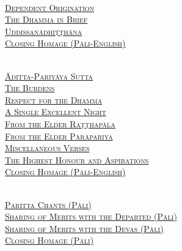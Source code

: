 \begin{center}
  \bigskip
  \clearpage

  {\libertinusFont\selectfont\textbf{\textsc{}}}\\

  \textsc{
    \hyperref[dependent-origination]{Dependent Origination}\\
    \hyperref[dhamma-in-brief]{The Dhamma in Brief}\\
    \hyperref[uddissanadhitthana]{Uddissanādhiṭṭhāna}\\
    \hyperref[closing-homage]{Closing Homage (Pāli-English)}}\\

  \medskip

  {\libertinusFont\selectfont\textbf{\textsc{}}}\\

  \textsc{
    \hyperref[aditta-pariyaya]{Āditta-Pariyāya Sutta}\\
    \hyperref[burdens]{The Burdens}\\
    \hyperref[respect-for-the-dhamma]{Respect for the Dhamma}\\
    \hyperref[single-excellent-night]{A Single Excellent Night}\\
    \hyperref[ratthapala]{From the Elder Raṭṭhapāla}\\
    \hyperref[parapariya]{From the Elder Pārāpariya}\\
    \hyperref[misc-verses]{Miscellaneous Verses}\\
    \hyperref[highest-honour-aspirations]{The Highest Honour and Aspirations}\\
    \hyperref[closing-homage]{Closing Homage (Pāli-English)}}\\ %

  \medskip

  {\libertinusFont\selectfont\textbf{\textsc{}}}\\

  \textsc{
    \hyperref[deva-aradhana]{Paritta Chants (Pāli)}\\
    \hyperref[sharing-merits-departed]{Sharing of Merits with the Departed (Pāli)}\\
    \hyperref[sharing-merits-devas]{Sharing of Merits with the Devas (Pāli)}\\
    \hyperref[closing-homage]{Closing Homage (Pāli)}}\\

  \medskip


\end{center}
